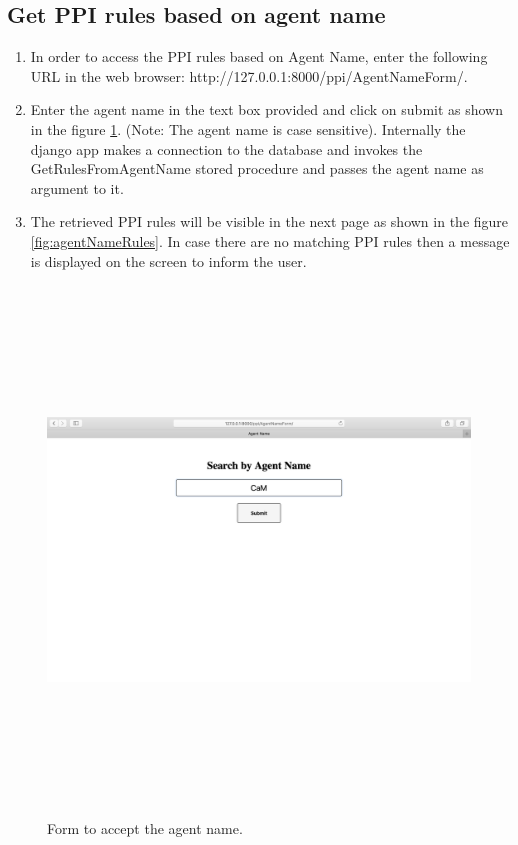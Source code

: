 \documentclass[msc,deptreport,ai]{infthesis}      %
\begin{document}
\subsection {Get PPI rules based on agent name}
\begin{enumerate}
	\item In order to access the PPI rules based on Agent Name, enter the following URL in the web browser: http://127.0.0.1:8000/ppi/AgentNameForm/.
	\item Enter the agent name in the text box provided and click on submit as shown in the figure \ref{fig:agentNameForm}. (Note: The agent name is case sensitive). Internally the django app makes a connection to the database and invokes the GetRulesFromAgentName stored procedure and passes the agent name as argument to it.
	\item The retrieved PPI rules will be visible in the next page as shown in the figure \ref{fig:agentNameRules}. In case there are no matching PPI rules then a message is displayed on the screen to inform the user.
\end{enumerate}
  \begin{figure}[H]
	\centering
	\captionsetup{justification=centering}
	\includegraphics[width=\linewidth,height=14cm,keepaspectratio]{AgentNameForm.png}	
	\caption{Form to accept the agent name.}
	\label{fig:agentNameForm}		
\end{figure}
\end{document}
